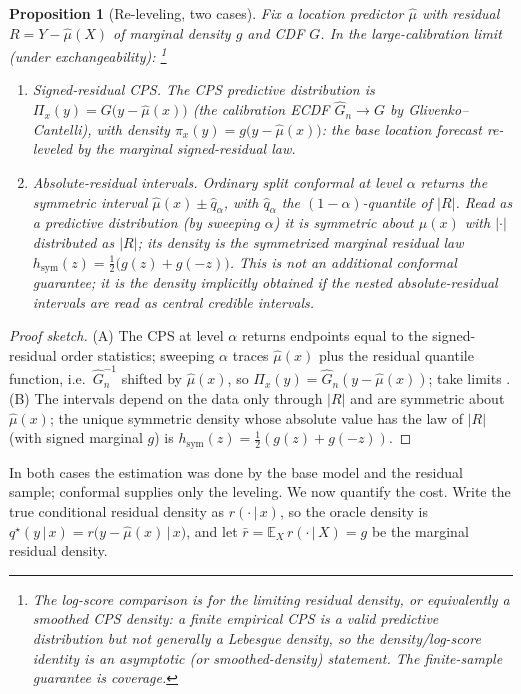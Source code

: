 \documentclass[11pt]{article}
\newtheorem{proposition}{Proposition}
\theoremstyle{definition}
\newcommand{\E}{\mathbb{E}}
\newcommand{\given}{\,\vert\,}
\begin{document}
\begin{proposition}[Re-leveling, two cases]\label{prop:relevel}
Fix a location predictor $\hat\mu$ with residual $R=Y-\hat\mu(X)$ of marginal density
$g$ and CDF $G$. In the large-calibration limit (under exchangeability):%
\footnote{The log-score comparison is for the limiting residual density, or equivalently a
smoothed CPS density: a finite empirical CPS is a valid predictive distribution but not
generally a Lebesgue density, so the density/log-score identity is an asymptotic (or
smoothed-density) statement. The finite-sample guarantee is coverage.}
\begin{enumerate}
\item[(A)] Signed-residual CPS. The CPS predictive distribution is
$\Pi_x(y)=G\big(y-\hat\mu(x)\big)$ (the calibration ECDF $\widehat G_n\to G$ by
Glivenko--Cantelli), with density $\pi_x(y)=g\big(y-\hat\mu(x)\big)$: the base location
forecast re-leveled by the marginal signed-residual law.
\item[(B)] Absolute-residual intervals. Ordinary split conformal at
level $\alpha$ returns the symmetric interval $\hat\mu(x)\pm \hat q_\alpha$, with
$\hat q_\alpha$ the $(1-\alpha)$-quantile of $|R|$. Read as a predictive distribution
(by sweeping $\alpha$) it is symmetric about $\hat\mu(x)$ with $|{\cdot}|$ distributed as
$|R|$; its density is the \emph{symmetrized} marginal residual law
$h_{\mathrm{sym}}(z)=\tfrac12\big(g(z)+g(-z)\big)$. This is not an additional conformal
guarantee; it is the density implicitly obtained if the nested absolute-residual intervals
are read as central credible intervals.
\end{enumerate}
\end{proposition}

\begin{proof}[Proof sketch]
(A) The CPS at level $\alpha$ returns endpoints equal to the signed-residual order
statistics; sweeping $\alpha$ traces $\hat\mu(x)$ plus the residual quantile function,
i.e.\ $\widehat G_n^{-1}$ shifted by $\hat\mu(x)$, so $\Pi_x(y)=\widehat G_n(y-\hat\mu(x))$;
take limits \citep{vovk2019nonparametric}. (B) The intervals depend on the data only
through $|R|$ and are symmetric about $\hat\mu(x)$; the unique symmetric density whose
absolute value has the law of $|R|$ (with signed marginal $g$) is
$h_{\mathrm{sym}}(z)=\tfrac12(g(z)+g(-z))$.
\end{proof}

In both cases the estimation was done by the base model and the residual sample; conformal
supplies only the leveling. We now quantify the cost. Write the true conditional residual
density as $r(\cdot\given x)$, so the oracle density is
$q^\star(y\given x)=r\big(y-\hat\mu(x)\given x\big)$, and let
$\bar r=\E_X\,r(\cdot\given X)=g$ be the marginal residual density.
\end{document}

